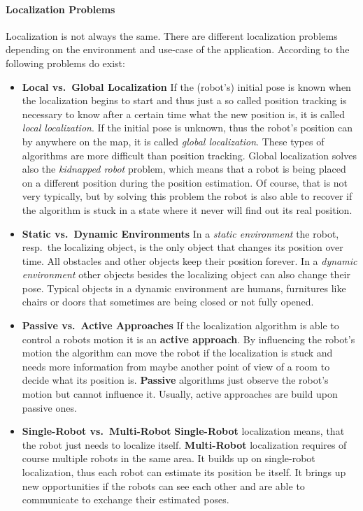 \paragraph{Localization Problems}
Localization is not always the same. There are different localization problems depending on the environment and use-case of the application. According to \citet{thrun:prob_robo} the following problems do exist:
\begin{itemize}
	\item \textbf{Local vs.\ Global Localization} If the (robot's) initial pose is known when the localization begins to start and thus just a so called position tracking is necessary to know after a certain time what the new position is, it is called \emph{local localization}. If the initial pose is unknown, thus the robot's position can by anywhere on the map, it is called \emph{global localization}. These types of algorithms are more difficult than position tracking. Global localization solves also the \emph{kidnapped robot} problem, which means that a robot is being placed on a different position during the position estimation. Of course, that is not very typically, but by solving this problem the robot is also able to recover if the algorithm is stuck in a state where it never will find out its real position.
	\item \textbf{Static vs.\ Dynamic Environments} In a \emph{static environment} the robot, resp.\ the localizing object, is the only object that changes its position over time. All obstacles and other objects keep their position forever. In a \emph{dynamic environment} other objects besides the localizing object can also change their pose. Typical objects in a dynamic environment are humans, furnitures like chairs or doors that sometimes are being closed or not fully opened.
	\item  \textbf{Passive vs.\ Active Approaches} If the localization algorithm is able to control a robots motion it is an \textbf{active approach}. By influencing the robot's motion the algorithm can move the robot if the localization is stuck and needs more information from maybe another point of view of a room to decide what its position is. \textbf{Passive} algorithms just observe the robot's motion but cannot influence it. Usually, active approaches are build upon passive ones.
	\item \textbf{Single-Robot vs.\ Multi-Robot} \textbf{Single-Robot} localization means, that the robot just needs to localize itself. \textbf{Multi-Robot} localization requires of course multiple robots in the same area. It builds up on single-robot localization, thus each robot can estimate its position be itself. It brings up new opportunities if the robots can see each other and are able to communicate to exchange their estimated poses.
\end{itemize}

